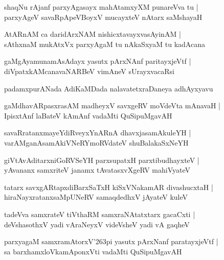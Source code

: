 \documentclass[twoside,12pt,openright]{book}
\def\S{\char'263}
\newcounter{shloka}[chapter]
\begin{document}
\begin{shloka}
shaqNu rAjanf parxyAgasayx mahAtamxyXM punareVva tu |\\
parxyAgeV savaRpApeVBoyxV mucayxteV nAtarx saMshayaH 
\end{shloka}

\begin{shloka}
AtARnAM ca daridArxNAM nishicxtavayxvasAyinAM |\\
sAthxnaM mukAtxVx parxyAgaM tu nAkaSxyaM tu kadAcana 
\end{shloka}

\begin{shloka}
gaMgAyamunamAsAdayx yasutx pArxNAnf paritayxjeVtf |\\
diVpatxkAMcanavaNARBeV vimAneV sUrayxvacaRsi
\end{shloka}

\begin{center}
padamxpurANada AdiKaMDada nalavatetxraDaneya adhAyxyavu
\end{center}

\begin{shloka}
gaMdhavARpasxrasAM madheyxV savxgeRV moVdeVta mAnavaH |\\
IpisxtAnf laBateV kAmAnf vadaMti QuSipuMgavAH 
\end{shloka}

\begin{shloka}
savaRratanxmayeYdiRveyxYnARnA dhavxjasamAkuleYH |\\
varAMganAsamAkiVNeRYmoRVdateV shuBalakaSxNeYH 
\end{shloka}

\begin{shloka}
giVtAvAditarxniGoRVSeYH parxsupatxH parxtibudhayxteV |\\
yAvananx samxriteV janamx tAvatasxvXgeRV mahiVyateV 
\end{shloka}

\begin{shloka}
tatarx savxgARtapxdiBarxSaTxH kiSxVNakamAR divashucxtaH |\\
hiraNayxratanxsaMpUNeRV samaqdedhxV jAyateV kuleV 
\end{shloka}

\begin{shloka}
tadeVva samxrateV tiVthaRM samxraNAtatxtarx gacaCxti |\\
deVshasothxV yadi  vAraNeyxV videVsheV yadi vA gaqheV
\end{shloka}

\begin{shloka}
parxyagaM samxramAtorxV\S pi yasutx pArxNanf paratayxjeVtf |\\
sa barxhamxloVkamAponxVti vadaMti QuSipuMgavAH 
\end{shloka}
\end{document}
